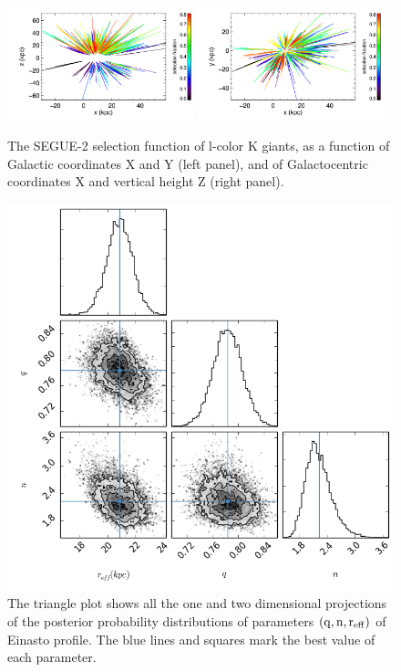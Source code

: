 \documentclass[12pt,preprint]{aastex}
\begin{document}
\begin{figure}[htbp]
\centering
\includegraphics[width=0.48\textwidth,height=0.3\textheight]{sfxzlkg}
\includegraphics[width=0.48\textwidth,height=0.3\textheight]{sfxylkg}
\caption{The SEGUE-2 selection function of l-color K giants, as a function of Galactic coordinates X and Y (left panel), and of Galactocentric coordinates X and vertical height Z (right panel).}
\label{f:flkgsf}
\end{figure}
\begin{figure}[htbp]
\centering
\includegraphics[width=\textwidth]{triangleeinasto}
\caption{The triangle plot shows all the one and two dimensional projections of the posterior probability distributions of parameters $\rm (q,n,r_{eff})$ of Einasto profile. The blue lines and squares mark the best value of each parameter.}
\label{f:feinasto}
\end{figure}
\end{document}
